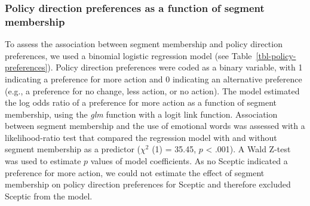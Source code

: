 \documentclass[
  letterpaper,
  DIV=11,
  numbers=noendperiod]{scrartcl}
\begin{document}
\subsubsection{Policy direction preferences as a function of segment
membership}\label{policy-direction-preferences-as-a-function-of-segment-membership}

To assess the association between segment membership and policy
direction preferences, we used a binomial logistic regression model (see
Table~\ref{tbl-policy-preferences}). Policy direction preferences were
coded as a binary variable, with 1 indicating a preference for more
action and 0 indicating an alternative preference (e.g., a preference
for no change, less action, or no action). The model estimated the log
odds ratio of a preference for more action as a function of segment
membership, using the \emph{glm} function with a logit link function.
Association between segment membership and the use of emotional words
was assessed with a likelihood-ratio test that compared the regression
model with and without segment membership as a predictor (\(\chi^{2}\)
(1) = 35.45, \(p\) \textless{} .001). A Wald Z-test was used to estimate
\(p\) values of model coefficients. As no Sceptic indicated a preference
for more action, we could not estimate the effect of segment membership
on policy direction preferences for Sceptic and therefore excluded
Sceptic from the model.
\end{document}
